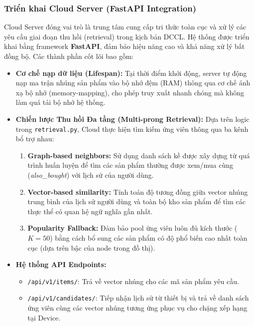 \subsubsection{Triển khai Cloud Server (FastAPI Integration)}

Cloud Server đóng vai trò là trung tâm cung cấp tri thức toàn cục và xử lý các yêu cầu giai đoạn thu hồi (retrieval) trong kịch bản DCCL. Hệ thống được triển khai bằng framework \textbf{FastAPI}, đảm bảo hiệu năng cao và khả năng xử lý bất đồng bộ. Các thành phần cốt lõi bao gồm:

\begin{itemize}
    \item \textbf{Cơ chế nạp dữ liệu (Lifespan):} Tại thời điểm khởi động, server tự động nạp ma trận nhúng sản phẩm vào bộ nhớ đệm (RAM) thông qua cơ chế ánh xạ bộ nhớ (memory-mapping), cho phép truy xuất nhanh chóng mà không làm quá tải bộ nhớ hệ thống.
    
    \item \textbf{Chiến lược Thu hồi Đa tầng (Multi-prong Retrieval):} Dựa trên logic trong \texttt{retrieval.py}, Cloud thực hiện tìm kiếm ứng viên thông qua ba kênh bổ trợ nhau:
    \begin{enumerate}
        \item \textbf{Graph-based neighbors:} Sử dụng danh sách kề được xây dựng từ quá trình huấn luyện để tìm các sản phẩm thường được xem/mua cùng (\textit{also\_bought}) với lịch sử của người dùng.
        \item \textbf{Vector-based similarity:} Tính toán độ tương đồng giữa vector nhúng trung bình của lịch sử người dùng và toàn bộ kho sản phẩm để tìm các thực thể có quan hệ ngữ nghĩa gần nhất.
        \item \textbf{Popularity Fallback:} Đảm bảo pool ứng viên luôn đủ kích thước ($K=50$) bằng cách bổ sung các sản phẩm có độ phổ biến cao nhất toàn cục (dựa trên bậc của node trong đồ thị).
    \end{enumerate}
    
    \item \textbf{Hệ thống API Endpoints:}
    \begin{itemize}
        \item \texttt{/api/v1/items/}: Trả về vector nhúng cho các mã sản phẩm yêu cầu.
        \item \texttt{/api/v1/candidates/}: Tiếp nhận lịch sử từ thiết bị và trả về danh sách ứng viên cùng các vector nhúng tương ứng phục vụ cho chặng xếp hạng tại Device.
    \end{itemize}
\end{itemize}


